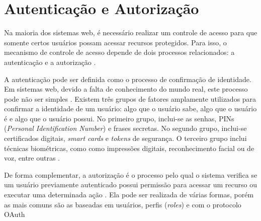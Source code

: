 \section{Autenticação e Autorização}

Na maioria dos sistemas web, é necessário realizar um controle de acesso para que somente
certos usuários possam acessar recursos protegidos. Para isso, o mecanismo  de controle de
acesso depende de dois processos relacionados: a autenticação e a autorização
\cite{SULLIVAN2011}.

A autenticação pode ser definida como o processo de confirmação de identidade. Em sistemas web,
devido a falta de conhecimento do mundo real, este processo pode não ser simples
\cite{CHAPMAN2012}. Existem três grupos de fatores amplamente utilizados para confirmar a
identidade de um usuário: algo que o usuário sabe, algo que o usuário é e algo que o usuário
possui. No primeiro grupo, inclui-se as senhas, PINs (\emph{Personal Identification Number}) e
frases secretas. No segundo grupo, inclui-se certificados digitais, \emph{smart cards} e
\emph{tokens} de segurança. O terceiro grupo inclui técnicas biométricas, como como impressões
digitais, reconhecimento facial ou de voz, entre outras \cite{SULLIVAN2011}.

De forma complementar, a autorização é o processo pelo qual o sistema verifica se um usuário 
previamente autenticado possui permissão para acessar um recurso ou executar uma determinada ação 
\cite{SPILCA2020}. Ela pode ser realizada de várias formas, porém as mais comuns são as baseadas em 
usuários, perfis (\emph{roles}) e com o protocolo OAuth \cite{CHAPMAN2012}

